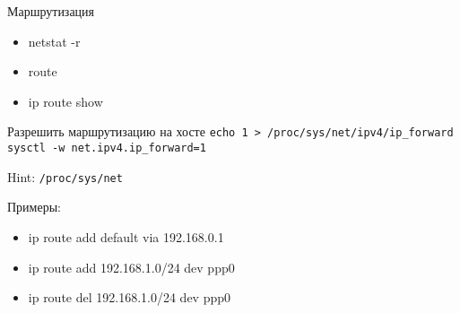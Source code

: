 \begin{frame}{Маршрутизация}
	\begin{itemize}
		\item netstat -r
		\item route
		\item ip route show
	\end{itemize}

	\begin{block}{Разрешить маршрутизацию на хосте}
		{\tt echo 1 > /proc/sys/net/ipv4/ip\_forward}\\
		{\tt sysctl -w net.ipv4.ip\_forward=1}
	\end{block}
	
	Hint: {\tt /proc/sys/net}

	Примеры:
	\begin{itemize}
		\item ip route add default via 192.168.0.1
		\item ip route add 192.168.1.0/24 dev ppp0
		\item ip route del 192.168.1.0/24 dev ppp0
	\end{itemize}

\end{frame}
